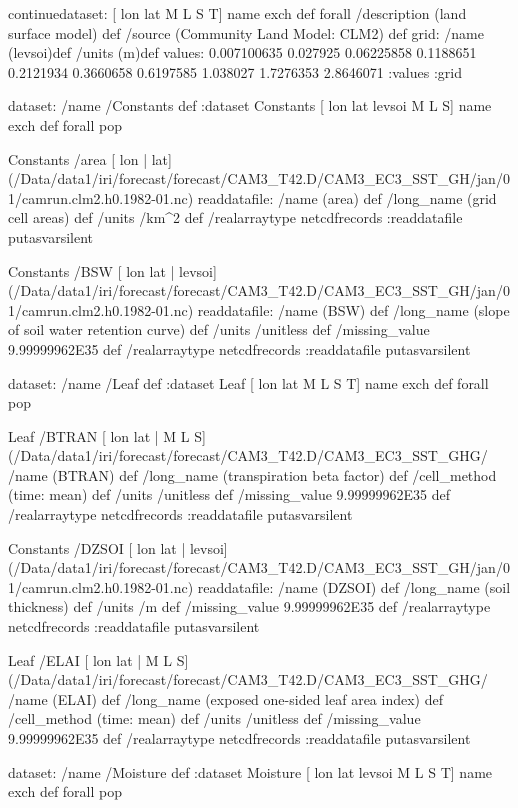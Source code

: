 \begin{ingrid}
continuedataset:
[ lon lat M L S T] {name exch def} forall
/description (land surface model) def
/source (Community Land Model: CLM2) def
grid:
/name (levsoi)def
/units (m)def
values: 0.007100635 0.027925 0.06225858 0.1188651 0.2121934 0.3660658 0.6197585 1.038027 1.7276353 2.8646071 :values
:grid

dataset: /name /Constants def :dataset
Constants [ lon lat levsoi M L S] {name exch def} forall pop

Constants /area{
[ lon | lat] 
(/Data/data1/iri/forecast/forecast/CAM3_T42.D/CAM3_EC3_SST_GH/jan/01/camrun.clm2.h0.1982-01.nc)
 readdatafile:
/name (area) def
 /long_name (grid cell areas) def
 /units /km^2 def
 /realarraytype netcdfrecords :readdatafile
}putasvarsilent




Constants /BSW{
[ lon lat | levsoi](/Data/data1/iri/forecast/forecast/CAM3_T42.D/CAM3_EC3_SST_GH/jan/01/camrun.clm2.h0.1982-01.nc) readdatafile:
/name (BSW) def
 /long_name (slope of soil water retention curve) def
 /units /unitless def
 /missing_value 9.99999962E35 def
 /realarraytype netcdfrecords :readdatafile
}putasvarsilent

dataset: /name /Leaf def :dataset
Leaf [ lon lat M L S T] {name exch def} forall pop

Leaf /BTRAN{
[ lon lat | M L S] (/Data/data1/iri/forecast/forecast/CAM3_T42.D/CAM3_EC3_SST_GHG/%
/name (BTRAN) def
 /long_name (transpiration beta factor) def
 /cell_method (time: mean) def
 /units /unitless def
 /missing_value 9.99999962E35 def
 /realarraytype netcdfrecords :readdatafile
}putasvarsilent

Constants /DZSOI{
[ lon lat | levsoi] (/Data/data1/iri/forecast/forecast/CAM3_T42.D/CAM3_EC3_SST_GH/jan/01/camrun.clm2.h0.1982-01.nc) readdatafile:
/name (DZSOI) def
 /long_name (soil thickness) def
 /units /m def
 /missing_value 9.99999962E35 def
 /realarraytype netcdfrecords :readdatafile
}putasvarsilent


Leaf /ELAI{
[ lon lat | M L S] (/Data/data1/iri/forecast/forecast/CAM3_T42.D/CAM3_EC3_SST_GHG/%
/name (ELAI) def
 /long_name (exposed one-sided leaf area index) def
 /cell_method (time: mean) def
 /units /unitless def
 /missing_value 9.99999962E35 def
 /realarraytype netcdfrecords :readdatafile
}putasvarsilent

dataset: /name /Moisture def :dataset
Moisture [ lon lat levsoi M L S T] {name exch def} forall pop


\end{ingrid}
